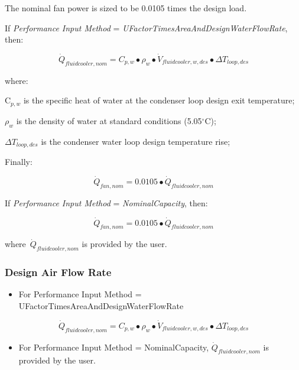 The nominal fan power is sized to be 0.0105 times the design load.

If \emph{Performance Input Method} = \emph{UFactorTimesAreaAndDesignWaterFlowRate}, then:

\begin{equation}
{\dot Q_{fluidcooler,nom}} = {C_{p,w}} \bullet {\rho_w} \bullet {\dot V_{fluidcooler,w,des}} \bullet \Delta {T_{loop,des}}
\end{equation}

where:

C\(_{p,w}\) is the specific heat of water at the condenser loop design exit temperature;

\emph{\(\rho_{w}\)} is the density of water at standard conditions (5.05\(^{\circ}\)C);

\emph{\(\Delta T_{loop,des}\)} is the condenser water loop design temperature rise;

Finally:

\begin{equation}
{\dot Q_{fan,nom}} = 0.0105 \bullet {\dot Q_{fluidcooler,nom}}
\end{equation}

If \emph{Performance Input Method} = \emph{NominalCapacity}, then:

\begin{equation}
  {\dot Q_{fan,nom}} = 0.0105 \bullet {\dot Q_{fluidcooler,nom}}
\end{equation}

where~\({\dot Q_{fluidcooler,nom}}\) is provided by the user.

\subsubsection{Design Air Flow Rate}\label{design-air-flow-rate-1}

\begin{itemize}
\tightlist
\item
  For Performance Input Method = UFactorTimesAreaAndDesignWaterFlowRate
\end{itemize}

\begin{equation}
{\dot Q_{fluidcooler,nom}} = {C_{p,w}} \bullet {\rho_w} \bullet {\dot V_{fluidcooler,w,des}} \bullet \Delta {T_{loop,des}}
\end{equation}

\begin{itemize}
\tightlist
\item
  For Performance Input Method = NominalCapacity, \({\dot Q_{fluidcooler,nom}}\) is provided by the user.
\end{itemize}

